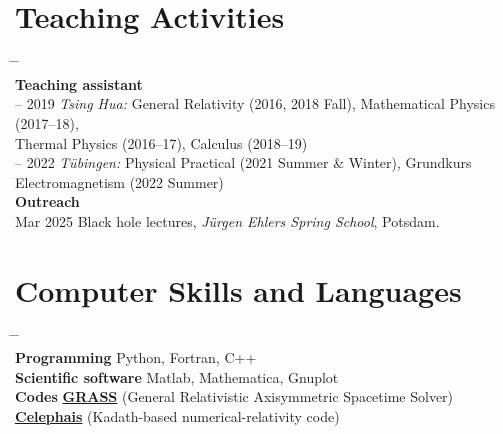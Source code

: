 \documentclass[10pt,floatfix,a4paper]{article}
\begin{document}
\section*{Teaching Activities}
\begin{tabbing}
  \hspace*{5mm} \= \hspace*{2.3cm} \= \hspace*{10cm} \\[-3ex]
  \> \textbf{Teaching assistant} \>  \\
   -- 2019 \> \textit{Tsing Hua:} General Relativity (2016, 2018 Fall),
                       Mathematical Physics (2017--18), \\
  \>               \> Thermal Physics (2016--17), Calculus (2018--19) \\
   -- 2022 \> \textit{T{\"u}bingen:} Physical Practical (2021 Summer \& Winter),
                       Grundkurs \\
  \>               \> Electromagnetism (2022 Summer) \\[1ex]
  \> \textbf{Outreach}  \> \\
  \> Mar 2025 \> Black hole lectures, \textit{Jürgen Ehlers Spring School}, Potsdam.
\end{tabbing}

\section*{Computer Skills and Languages}
\begin{tabbing}
  \hspace*{5mm} \= \hspace*{3.2cm} \= \hspace*{10cm} \\[-3ex]
  \> \textbf{Programming} \> Python, Fortran, C++ \\
  \> \textbf{Scientific software} \> Matlab, Mathematica, Gnuplot \\
  \> \textbf{Codes} \> \href{https://hao-jui.github.io/grass.html}{\textbf{\textcolor{AEIRed}{GRASS}}} (General Relativistic Axisymmetric Spacetime Solver) \\
  \> \> \href{https://hao-jui.github.io/celephais.html}{\textbf{\textcolor{AEIRed}{Celephais}}} (Kadath-based numerical-relativity code)
\end{tabbing}

\iffalse
\end{document}
